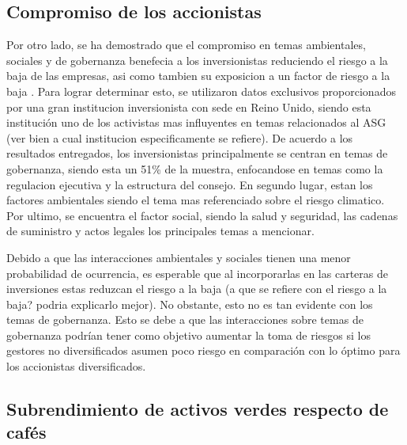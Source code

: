 
\subsection{Compromiso de los accionistas}

Por otro lado, se ha demostrado que el compromiso en temas ambientales, sociales y de gobernanza benefecia a los inversionistas reduciendo el riesgo a la baja de las empresas, asi como tambien su exposicion a un factor de riesgo a la baja \cite{hoepner_esg_2022}. Para lograr determinar esto, se utilizaron datos exclusivos proporcionados por una gran institucion inversionista con sede en Reino Unido, siendo esta institución uno de los activistas mas influyentes en temas relacionados al ASG (ver bien a cual institucion especificamente se refiere). De acuerdo a los resultados entregados, los inversionistas principalmente se centran en temas de gobernanza, siendo esta un 51\% de la muestra, enfocandose en temas como la regulacion ejecutiva y la estructura del consejo. En segundo lugar, estan los factores ambientales siendo el tema mas referenciado sobre el riesgo climatico. Por ultimo, se encuentra el factor social, siendo la salud y seguridad, las cadenas de suministro y actos legales los principales temas a mencionar.

\vspace{0.5cm}

Debido a que las interacciones ambientales y sociales tienen una menor probabilidad de ocurrencia, es esperable que al incorporarlas en las carteras de inversiones estas reduzcan el riesgo a la baja (a que se refiere con el riesgo a la baja? podria explicarlo mejor). No obstante, esto no es tan evidente con los temas de gobernanza. Esto se debe a que las interacciones sobre temas de gobernanza podrían tener como objetivo aumentar la toma de riesgos si los gestores no diversificados asumen poco riesgo en comparación con lo óptimo para los accionistas diversificados. 

\vspace{0.5cm}
\subsection{Subrendimiento de activos verdes respecto de cafés}



